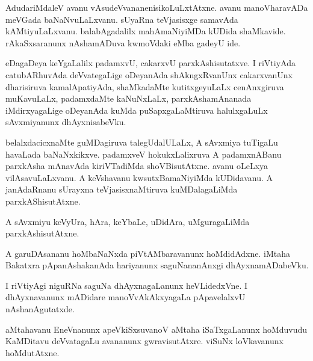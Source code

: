 \documentclass{article}
\begin{document}
\begin{mn}%
AdudariMdaleV avanu vAsudeVvananenisikoLuLxtAtxne. avanu manoVharavADa meVGada 
baNaNvuLaLxvanu. sUyaRna teVjasisxge samavAda kAMtiyuLaLxvanu. balabAgadalilx 
mahAmaNiyiMDa kUDida shaMkavide. rAkaSxsaranunx nAshamADuva kwmoVdaki eMba gadeyU ide.
\end{mn}

\begin{mn}%
eDagaDeya keYgaLalilx padamxvU, cakarxvU parxkAshisutatxve. I riVtiyAda catubARhuvAda 
deVvategaLige oDeyanAda shAkngxRvanUnx cakarxvanUnx dharisiruva kamalApatiyAda, 
shaMkadaMte kutitxgeyuLaLx cenAnxgiruva muKavuLaLx, padamxdaMte kaNuNxLaLx, 
parxkAshamAnanada iMdirxyagaLige oDeyanAda kuMda puSapxgaLaMtiruva halulxgaLuLx 
sAvxmiyanunx dhAyxnisabeVku.
\end{mn}

\begin{mn}%
belalxdacicxnaMte guMDagiruva talegUdalULaLx, A sAvxmiya tuTigaLu havaLada baNaNxkikxve. 
padamxveV hokukxLalixruva A padamxnABanu parxkAsha mAnavAda kiriVTadiMda shoVBisutAtxne. 
avanu oLeLxya vilAsavuLaLxvanu. A keVshavanu kwsutxBamaNiyiMda kUDidavanu. A janAdaRnanu 
sUrayxna teVjasisxnaMtiruva kuMDalagaLiMda parxkAShisutAtxne.
\end{mn}

\begin{mn}%
A sAvxmiyu keVyUra, hAra, keYbaLe, uDidAra, uMguragaLiMda parxkAshisutAtxne.
\end{mn}

\begin{mn}%
A garuDAsananu hoMbaNaNxda piVtAMbaravanunx hoMdidAdxne. iMtaha Bakatxra pApanAshakanAda 
hariyanunx saguNananAnxgi dhAyxnamADabeVku.
\end{mn}

\begin{mn}%
I riVtiyAgi niguRNa saguNa dhAyxnagaLanunx heVLidedxVne. I dhAyxnavanunx mADidare 
manoVvAkAkxyagaLa pApavelalxvU nAshanAgutatxde.
\end{mn}

\begin{mn}%
aMtahavanu EneVnanunx apeVkiSxsuvanoV aMtaha iSaTxgaLanunx hoMduvudu KaMDitavu deVvatagaLu 
avananunx gwravisutAtxre. viSuNx loVkavanunx hoMdutAtxne.
\end{mn}


\end{document}
